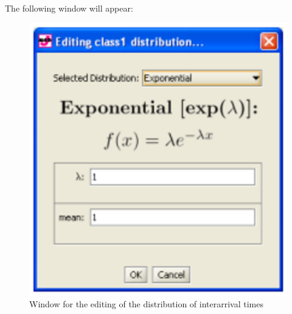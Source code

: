 The following window will appear:
\begin{figure}[htb!]
    \begin{center}
        \includegraphics[scale=.5]{img/jsimg/3.5.eps}
    \end{center}
    \caption{Window for the editing of the distribution of interarrival times}
    \label{fig:editdistrib}
\end{figure}

